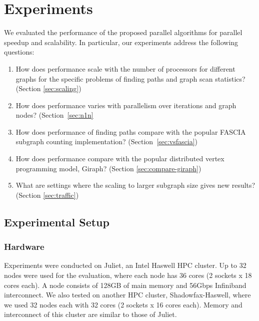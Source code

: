 \section{Experiments}
\label{sec:experiments}
We evaluated the performance of the proposed parallel algorithms for parallel speedup and scalability. In particular, our experiments address the following questions:


\begin{enumerate}
\item 
How does performance scale with the number of processors for different graphs for the specific problems of finding paths and graph scan statistics? (Section \ref{sec:scaling})
\item
How does performance varies with parallelism over iterations and graph nodes? (Section~\ref{sec:n1n}
\item
How does performance of finding paths compare with the popular FASCIA~\cite{6877274} subgraph counting implementation? (Section~\ref{sec:vsfascia})
\item
How does performance compare with the popular distributed vertex programming model,
Giraph? (Section \ref{sec:compare-giraph})
\item
What are settings where the scaling to larger subgraph size gives new results? (Section \ref{sec:traffic})
\end{enumerate}

\subsection{Experimental Setup}
\subsubsection{Hardware}
Experiments were conducted on Juliet, an Intel Haswell HPC cluster. Up to 32 nodes were used for the evaluation, where each node has 36 cores (2 sockets x 18 cores each). A node consists of 128GB of main memory and 56Gbps Infiniband interconnect. We also tested on another HPC cluster, Shadowfax-Haswell, where we used 32 nodes each with 32 cores (2 sockets x 16 cores each). Memory and interconnect of this cluster are similar to those of Juliet.

